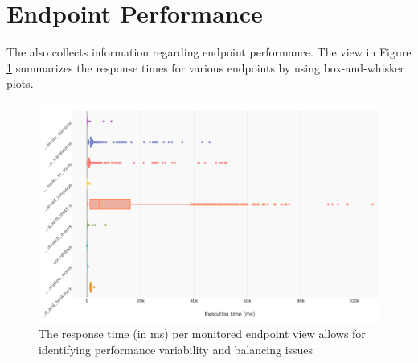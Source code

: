 \documentclass[conference]{IEEEtran}
\begin{document}





\section{Endpoint Performance}
\label{sec:perf}

  The \tool also collects information regarding endpoint performance. The view in Figure \ref{fig:ep} summarizes the response times for various endpoints by using box-and-whisker plots. 


  \begin{figure}[!ht]
    \centering
    \includegraphics[width=\linewidth]{endpoint_performance.png}
    \caption{The response time (in ms) per monitored endpoint view allows for identifying performance variability and balancing issues}
    \label{fig:ep}
  \end{figure}
\end{document}

